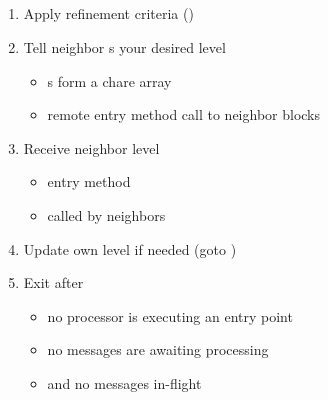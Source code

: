 \NEWSEC

\subsection{\ssAdapt}


\begin{frame}[fragile,label=ss-adapt] 
\secframetitle{\ssAdapt}

\begin{enumerate}
\item Apply refinement criteria ()
\item Tell neighbor s your desired level
\begin{itemize}
\item {}s form a chare array
\item remote entry method call to neighbor blocks
\end{itemize}
\item Receive neighbor level
\begin{itemize}
\item entry method
\item called by neighbors
\end{itemize}
\item Update own level if needed (goto )
\item Exit after 
\begin{itemize}
\item no processor is executing an entry point
\item no messages are awaiting processing
\item and no messages in-flight
\end{itemize}
\end{enumerate}
\end{frame}


